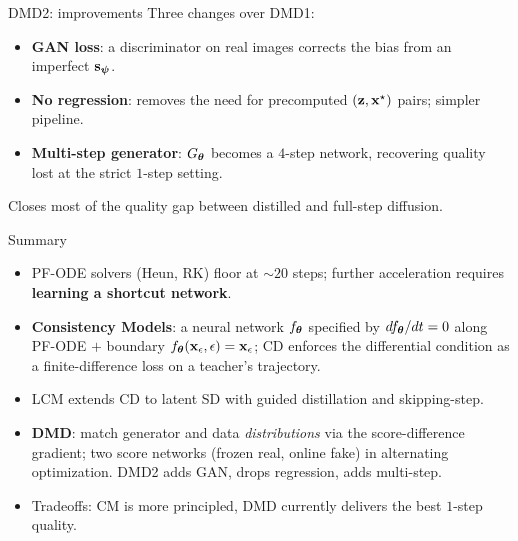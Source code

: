 \documentclass{beamer}
\renewcommand{\eqpause}{}
\renewcommand{\nextonslide}[1]{#1}
\begin{document}
\begin{frame}{DMD2: improvements}
	Three changes over DMD1:
	\eqpause
	\begin{itemize}
		\item \textbf{GAN loss}: a discriminator on real images corrects the bias from an imperfect $\mathbf{s}_{\boldsymbol{\psi}}$.
		\nextonslide{\item \textbf{No regression}: removes the need for precomputed $(\mathbf{z}, \mathbf{x}^\star)$ pairs; simpler pipeline.}
		\nextonslide{\item \textbf{Multi-step generator}: $G_{\boldsymbol{\theta}}$ becomes a $4$-step network, recovering quality lost at the strict $1$-step setting.}
	\end{itemize}
	\eqpause
	Closes most of the quality gap between distilled and full-step diffusion.
\end{frame}
\begin{frame}{Summary}
	\begin{itemize}
		\item PF-ODE solvers (Heun, RK) floor at ${\sim}20$ steps; further acceleration requires \textbf{learning a shortcut network}.
		\item \textbf{Consistency Models}: a neural network $f_{\boldsymbol{\theta}}$ specified by $df_{\boldsymbol{\theta}}/dt = 0$ along PF-ODE $+$ boundary $f_{\boldsymbol{\theta}}(\mathbf{x}_{\epsilon}, \epsilon) = \mathbf{x}_{\epsilon}$; CD enforces the differential condition as a finite-difference loss on a teacher's trajectory.
		\item LCM extends CD to latent SD with guided distillation and skipping-step.
		\item \textbf{DMD}: match generator and data \emph{distributions} via the score-difference gradient; two score networks (frozen real, online fake) in alternating optimization. DMD2 adds GAN, drops regression, adds multi-step.
		\item Tradeoffs: CM is more principled, DMD currently delivers the best $1$-step quality.
	\end{itemize}
\end{frame}
\end{document}
